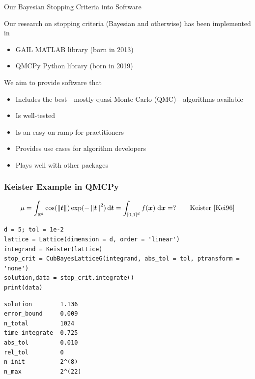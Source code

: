 \documentclass[11pt,compress,xcolor={usenames,dvipsnames},aspectratio=169]{beamer}
\begin{document}
\begin{frame}{Our Bayesian Stopping Criteria into Software}
	
	\vspace{-3ex}
	
	Our research on stopping criteria (Bayesian and otherwise) has been implemented in
	\begin{itemize}
		\item GAIL \cite{ChoEtal21a} MATLAB library (born in 2013)
		\item QMCPy \cite{QMCPy2020a} Python library (born in 2019)
	\end{itemize}
We aim to provide software that 
\begin{itemize}
	\item Includes the best---mostly quasi-Monte Carlo (QMC)---algorithms available
	\item Is well-tested
	\item Is an easy on-ramp for practitioners
	\item Provides use cases for algorithm developers 
	\item Plays well with other packages
\end{itemize}
	
	
\end{frame}
	

\begin{frame}[fragile]\frametitle{Keister Example in QMCPy \href{https://colab.research.google.com/drive/1KrlrtLu7j8Ff7YsSJjPMiGUr-UKfqwxm?usp=sharing}{}}
	\vspace{-5ex}
	\[
	\mu = \int_{\mathbb{R}^d} \cos(\left \lVert \boldsymbol{t} \right \rVert_{{}}) \exp(-\left \lVert \boldsymbol{t} \right \rVert_{{}}^2) \, {\rm d} \boldsymbol{t} = \int_{[0,1]^d} f(\boldsymbol{x}) \; {\rm d} \boldsymbol{x} =  ? \qquad \text{Keister \cite{Kei96}}
	\]
\noindent\begin{minipage}{0.47\textwidth}
\begin{lstlisting}[style=Python]
d = 5; tol = 1e-2
lattice = Lattice(dimension = d, order = 'linear')
integrand = Keister(lattice)
stop_crit = CubBayesLatticeG(integrand, abs_tol = tol, ptransform = 'none')
solution,data = stop_crit.integrate()
print(data)
\end{lstlisting}
\end{minipage} 
\qquad
\begin{minipage}{0.47\textwidth}
\begin{lstlisting}[style=Python]
solution        1.136
error_bound     0.009
n_total         1024
time_integrate  0.725
abs_tol         0.010
rel_tol         0
n_init          2^(8)
n_max           2^(22)
\end{lstlisting}
\end{minipage} 

\end{frame}
\end{document}
